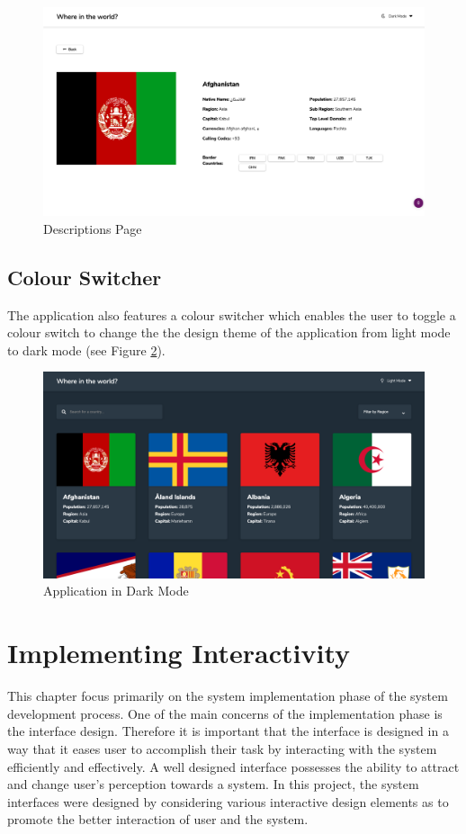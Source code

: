 \documentclass[twoside, a4paper, 12pt]{report}
\begin{document}
\begin{figure}
	\centering
	\includegraphics[width=1.0\textwidth]{DescriptionsPage.png}
	\caption{Descriptions Page}
	\label{fig:descriptions_page}
\end{figure}

\subsection{Colour Switcher}
The application also features a colour switcher which enables the user to toggle a colour switch to change the the design theme of the application from light mode to dark mode (see Figure \ref{fig:darkmode}).

\begin{figure} [ht]
	\centering
	\includegraphics[width=1.0\textwidth]{darkmode.png}
	\caption{Application in Dark Mode}
	\label{fig:darkmode}
\end{figure}

\section{Implementing Interactivity}
This chapter focus primarily on the system implementation phase of the system development process. One of the main concerns of the implementation phase is the interface design. Therefore it is important that the interface is designed in a way that it eases user to accomplish their task by interacting with the system efficiently and effectively. A well designed interface possesses the ability to attract and change user’s perception towards a system. In this project, the system interfaces were designed by considering various interactive design elements as to promote the better interaction of user and the system.
\end{document}
